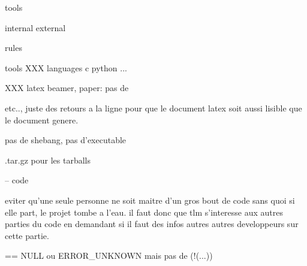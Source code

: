 tools

  internal
  external

rules

  tools
    XXX
  languages
    c
    python
    ...

XXX latex
beamer, %
paper: pas de \par etc.., juste des retours a la ligne pour que le document
latex soit aussi lisible que le document genere.

pas de shebang, pas d'executable

.tar.gz pour les tarballs

-- code

eviter qu'une seule personne ne soit maitre d'un gros bout de code sans
quoi si elle part, le projet tombe a l'eau. il faut donc que tlm s'interesse
aux autres parties du code en demandant si il faut des infos autres autres
developpeurs sur cette partie.

== NULL ou ERROR_UNKNOWN mais pas de (!(...))
